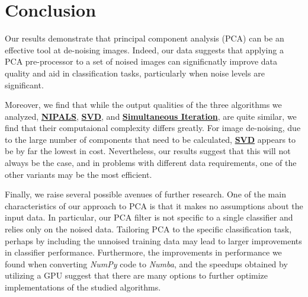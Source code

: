 \documentclass[12pt]{article}
\begin{document}
\pagebreak
\section{Conclusion}\label{7}

   Our results demonstrate that principal component analysis (PCA) can be an effective tool at de-noising images. Indeed, our data suggests that applying a PCA pre-processor to a set of noised images can significnatly improve data quality and aid in classification tasks, particularly when noise levels are significant. 
    
    Moreover, we find that while the output qualities of the three algorithms we analyzed, \textbf{\hyperref[3.1]{NIPALS}}, \textbf{\hyperref[3.2]{SVD}}, and \textbf{\hyperref[3.3]{Simultaneous Iteration}}, are quite similar, we find that their computaional complexity differs greatly. For image de-noising, due to the large number of components that need to be calculated, \textbf{\hyperref[3.2]{SVD}} appears to be by far the lowest in cost. Nevertheless, our results suggest that this will not always be the case, and in problems with different data requirements, one of the other variants may be the most efficient. 
    
    Finally, we raise several possible avenues of further research. One of the main characteristics of our approach to PCA is that it makes no assumptions about the input data. In particular, our PCA filter is not specific to a single classifier and relies only on the noised data. Tailoring PCA to the specific classification task, perhaps by including the unnoised training data may lead to larger improvements in classifier performance. Furthermore, the improvements in performance we found when converting \textit{NumPy} code to \textit{Numba}, and the speedups obtained by utilizing a GPU suggest that there are many options to further optimize implementations of the studied algorithms.


\pagebreak





\end{document}
